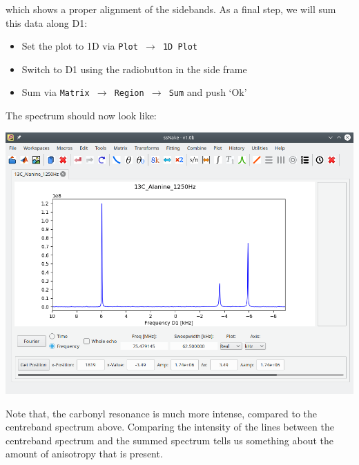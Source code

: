 \documentclass[11pt,a4paper]{article}
\begin{document}
which shows a proper alignment of the sidebands.
As a final step, we will sum this data along D1:
\begin{itemize}
  \item Set the plot to 1D via \texttt{Plot $\longrightarrow$ 1D Plot}
  \item Switch to D1 using the radiobutton in the side frame
  \item Sum via \texttt{Matrix $\longrightarrow$ Region $\longrightarrow$ Sum} and push `Ok'
\end{itemize}
The spectrum should now look like:
\begin{center}
\includegraphics[width=0.8\linewidth]{Figs/Fig7.png}
\end{center}
Note that, the carbonyl resonance is much more intense, compared to the centreband spectrum above.
Comparing the intensity of the lines between the centreband spectrum and the summed spectrum tells us something about the amount of anisotropy that is present.
\end{document}
